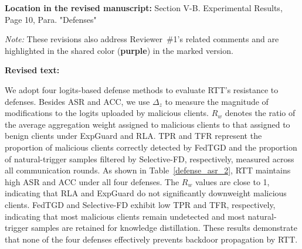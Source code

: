 \documentclass[11pt,a4paper]{article}
\newcommand{\manualindent}{\par\noindent\hspace*{1.5em}\ignorespaces}
\newcommand{\revisedtext}[2]{%
  {\bfseries\color{headingnavy}Location in the revised manuscript:} #1\par
  \begin{tcolorbox}[
      enhanced,breakable,colback=replyblue!3,colframe=replyblue!18,
      before upper={\setlength{\parskip}{6pt}},
      borderline west={2.5pt}{0pt}{replyblue},
      boxrule=0.5pt,arc=1mm,left=11pt,right=9pt,top=8pt,bottom=8pt]
    {\bfseries\color{headingnavy}Revised text:}\par
    #2
  \end{tcolorbox}
  \vspace{0.35em}%
}
\begin{document}
\revisedtext{Section V-B. Experimental Results, Page 10, Para. "Defenses"\par \noindent \textit{Note:} These revisions also address Reviewer~\#1's related comments and are highlighted in the shared color (\textcolor{share}{\textbf{purple}}) in the marked version.}{\manualindent We adopt four logits-based defense methods to evaluate RTT's resistance to defenses.
Besides ASR and ACC, we use $\Delta_z$ to measure the magnitude of modifications to the logits uploaded by malicious clients.
$R_w$ denotes the ratio of the average aggregation weight assigned to malicious clients to that assigned to benign clients under ExpGuard and RLA.
TPR and TFR represent the proportion of malicious clients correctly detected by FedTGD and the proportion of natural-trigger samples filtered by Selective-FD, respectively, measured across all communication rounds.
As shown in Table~\ref{defense_asr_2}, RTT maintains high ASR and ACC under all four defenses. 
The $R_w$ values are close to 1, indicating that RLA and ExpGuard do not significantly downweight malicious clients. 
FedTGD and Selective-FD exhibit low TPR and TFR, respectively, indicating that most malicious clients remain undetected and most natural-trigger samples are retained for knowledge distillation.
These results demonstrate that none of the four defenses effectively prevents backdoor propagation by RTT.

}
\end{document}
